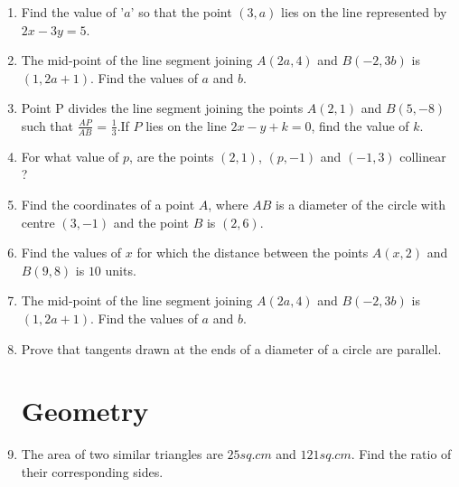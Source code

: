 \documentclass[2pt,-letter paper]{article}
\providecommand{\brak}[1]{\ensuremath{\left(#1\right)}}
\begin{document}
\begin{enumerate}
\item Find the value of '$a$' so that the point $\brak{3, a}$ lies on the line represented
by $2 x - 3 y = 5$.

\item The mid-point of the line segment joining $A\brak{2a, 4}$ and $B\brak{-2, 3b}$ is $\brak{1, 2a + 1}$. Find the values of $a$ and $b$.

\item Point P divides the line segment joining the points $A\brak{2, 1}$ and $B\brak{5, -8}$ such that $\frac{AP}{AB}$ = $\frac{1}{3}$.If $P$ lies on the line $2x - y + k = 0$, find the value of $k$.

\item For what value of $p$, are the points $\brak{2, 1}$, $\brak{p,- 1}$ and $\brak{- 1, 3}$ collinear ?

\item Find the coordinates of a point $A$, where $AB$ is a diameter of the circle with centre $\brak{3, -1}$ and the point $B$ is $\brak{2, 6}$.

\item Find the values of $x$ for which the distance between the points $A\brak{x, 2}$ and $B\brak{9, 8}$ is $10$ units.

\item The mid-point of the line segment joining $A\brak{2a, 4}$ and $B\brak{-2, 3b}$ is $\brak{1, 2a + 1}$. Find the values of $a$ and $b$.

\item Prove that tangents drawn at the ends of a diameter of a circle are parallel.

\section{Geometry}

\item The area of two similar triangles are $25 sq. cm$ and $121 sq. cm$. Find the
ratio of their corresponding sides.


\end{enumerate}
\end{document}
